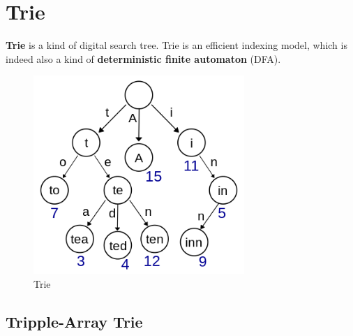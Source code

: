 \documentclass[a3paper, 12pt]{book} %
\begin{document}
\chapter{Trie}
\textbf{Trie} is a kind of digital search tree. Trie is an efficient indexing model, which is indeed also a kind of \textbf{deterministic finite automaton} (DFA).
\begin{figure}[htpb]
	\centering
	\includegraphics[width=8cm]{figures/trie.png}
	\caption{Trie}
	\label{fig:boat1}
\end{figure}
\section{Tripple-Array Trie}
\end{document}
